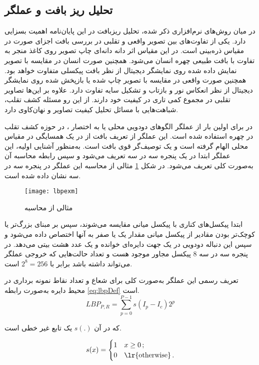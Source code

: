 \subsection{تحلیل ریز بافت و عملگر }
در میان روش‌های نرم‌افزاری ذکر شده، تحلیل ریزبافت در این پایان‌نامه اهمیت بسزایی دارد. یکی از تفاوت‌های بین تصویر واقعی و تقلبی در بررسی بافت اجزای صورت در مقیاس ذره‌بینی
 است. در این مقیاس اثر دانه دانه‌ای چاپ تصویر روی کاغذ منجر به تفاوت با بافت طبیعی چهره انسان  می‌شود. همچنین صورت انسان در مقایسه با تصویر نمایش داده شده روی نمایشگر دیجیتال از نظر بافت پیکسلی متفاوت خواهد بود. همچنین صورت واقعی در مقایسه با تصویر چاپ شده یا بازپخش  شده روی نمایشگر دیجیتال از نظر انعکاس نور و بازتاب و تشکیل سایه تفاوت دارد. علاوه بر این‌ها تصاویر تقلبی در مجموع کمی تاری در کیفیت خود دارند. از این رو مسئله کشف تقلب، شباهت‌هایی با مسائل تحلیل کیفیت تصاویر و نهان‌کاوی دارد.

در 
\cite{maatta2011face}
برای اولین بار از عملگر الگوهای دودویی محلی یا به اختصار ، در حوزه کشف تقلب در چهره استفاده شده است. این عملگر از تعریف بافت از در یک همسایگی در مقیاس محلی الهام گرفته است و یک توصیف‌گر قوی بافت است. به‌منظور آشنایی اولیه، این عملگر ابتدا در یک پنجره سه در سه تعریف می‌شود و سپس رابطه محاسبه آن به‌صورت کلی تعریف می‌شود. در شکل 
\ref{fig:lbpexm}
مثالی از محاسبه این عملگر در پنجره سه در سه نشان داده شده است.

\begin{figure}[ht]
	\centerline{\texttt{[image: lbpexm]}}
	\caption{مثالی از محاسبه  \cite{maatta2011face}}
	\label{fig:lbpexm}
\end{figure}
ابتدا پیکسل‌های کناری با پیکسل میانی مقایسه می‌شوند، سپس بر مبنای بزرگ‌تر یا کوچک‌تر بودن مقادیر از پیکسل میانی مقدار یک یا صفر به آنها اختصاص داده می‌شود و سپس این دنباله دودویی در یک جهت دایره‌ای خوانده و یک عدد هشت بیتی می‌دهد. در پنجره سه در سه 8 پیکسل مجاور موجود هست و تعداد حالت‌هایی که خروجی عملگر می‌تواند داشته باشد برابر با
$2^8=256$
است.





تعریف رسمی این عملگر به‌صورت کلی برای شعاع  و تعداد نقاط نمونه برداری  در محیط دایره به‌صورت رابطه
\ref{eq:lbpDef}
است.
\begin{equation}\label{eq:lbpDef}
			LBP_{P,R}=\sum_{p=0}^{P-1}s(I_p-I_c)2^p 
\end{equation}

که در آن
$s(.)$
یک تابع غیر خطی است.

\[ s(x) = 
\begin{cases} 1  & \text{$x \geq 0 $}\,; \\
	0  & \text{\lr{otherwise}}\,.
\end{cases} \]


